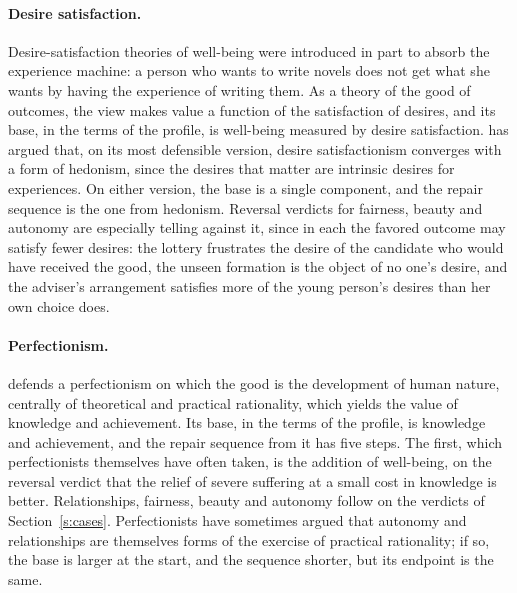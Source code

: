 \documentclass{situationist-preprint}
\begin{document}
\paragraph{Desire satisfaction.} Desire-satisfaction theories of well-being were introduced in part to absorb the experience machine: a person who wants to write novels does not get what she wants by having the experience of writing them. As a theory of the good of outcomes, the view makes value a function of the satisfaction of desires, and its base, in the terms of the profile, is well-being measured by desire satisfaction. \citet{Heathwood2006} has argued that, on its most defensible version, desire satisfactionism converges with a form of hedonism, since the desires that matter are intrinsic desires for experiences. On either version, the base is a single component, and the repair sequence is the one from hedonism. Reversal verdicts for fairness, beauty and autonomy are especially telling against it, since in each the favored outcome may satisfy fewer desires: the lottery frustrates the desire of the candidate who would have received the good, the unseen formation is the object of no one's desire, and the adviser's arrangement satisfies more of the young person's desires than her own choice does.

\paragraph{Perfectionism.} \citet{Hurka1993} defends a perfectionism on which the good is the development of human nature, centrally of theoretical and practical rationality, which yields the value of knowledge and achievement. Its base, in the terms of the profile, is knowledge and achievement, and the repair sequence from it has five steps. The first, which perfectionists themselves have often taken, is the addition of well-being, on the reversal verdict that the relief of severe suffering at a small cost in knowledge is better. Relationships, fairness, beauty and autonomy follow on the verdicts of Section~\ref{s:cases}. Perfectionists have sometimes argued that autonomy and relationships are themselves forms of the exercise of practical rationality; if so, the base is larger at the start, and the sequence shorter, but its endpoint is the same.
\end{document}
